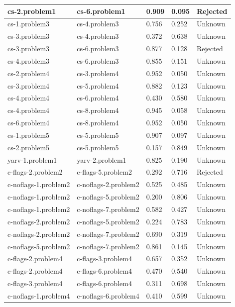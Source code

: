 \begin{appendices}
\begin{table}[h]
\begin{adjustbox}{height=0.5\textheight}
\begin{tabular}{|l|l|l|l|l|}
cs-2.problem1 & cs-6.problem1 & 0.909 & 0.095 & Rejected\\ \hline
cs-1.problem3 & cs-4.problem3 & 0.756 & 0.252 & Unknown\\ \hline
cs-3.problem3 & cs-4.problem3 & 0.372 & 0.638 & Unknown\\ \hline
cs-3.problem3 & cs-6.problem3 & 0.877 & 0.128 & Rejected\\ \hline
cs-4.problem3 & cs-6.problem3 & 0.855 & 0.151 & Unknown\\ \hline
cs-2.problem4 & cs-3.problem4 & 0.952 & 0.050 & Unknown\\ \hline
cs-3.problem4 & cs-5.problem4 & 0.882 & 0.123 & Unknown\\ \hline
cs-4.problem4 & cs-6.problem4 & 0.430 & 0.580 & Unknown\\ \hline
cs-4.problem4 & cs-8.problem4 & 0.945 & 0.058 & Unknown\\ \hline
cs-6.problem4 & cs-8.problem4 & 0.952 &0.050 & Unknown\\ \hline
cs-1.problem5 & cs-5.problem5 & 0.907 & 0.097 & Unknown\\ \hline
cs-2.problem5 & cs-5.problem5 & 0.157 & 0.849 & Unknown\\ \hline
yarv-1.problem1 & yarv-2.problem1 & 0.825 & 0.190 & Unknown\\ \hline
c-flags-2.problem2 & c-flags-5.problem2 & 0.292 & 0.716 & Rejected\\ \hline
c-noflags-1.problem2 & c-noflags-2.problem2 & 0.525 & 0.485 & Unknown\\ \hline
c-noflags-1.problem2 & c-noflags-5.problem2 & 0.200 & 0.806 & Unknown\\ \hline
c-noflags-1.problem2 & c-noflags-7.problem2 & 0.582 & 0.427 & Unknown\\ \hline
c-noflags-2.problem2 & c-noflags-5.problem2 & 0.224 & 0.783 & Unknown\\ \hline
c-noflags-2.problem2 & c-noflags-7.problem2 & 0.690 & 0.319 & Unknown\\ \hline
c-noflags-5.problem2 & c-noflags-7.problem2 & 0.861 & 0.145 & Unknown\\ \hline
c-flags-2.problem4 & c-flags-3.problem4 & 0.657 & 0.352 & Unknown\\ \hline
c-flags-2.problem4 & c-flags-6.problem4 & 0.470 & 0.540 & Unknown\\ \hline
c-flags-3.problem4 & c-flags-6.problem4 & 0.311 & 0.698 & Unknown\\ \hline
c-noflags-1.problem4 & c-noflags-6.problem4 & 0.410 & 0.599 & Unknown\\ \hline

\end{tabular}
\end{adjustbox}
\end{table}
\end{appendices}
